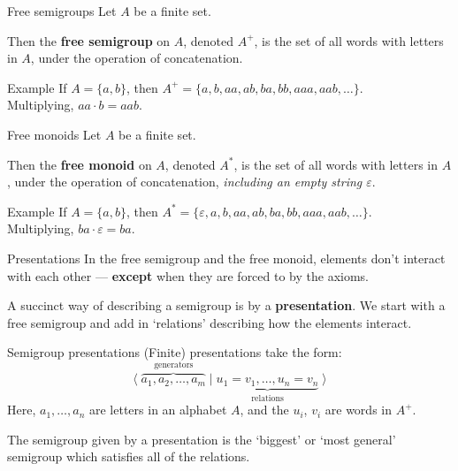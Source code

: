 \documentclass{beamer}
\let\epsilon\varepsilon
\newcommand{\pskip}{\medskip}
\begin{document}
\begin{frame}{Free semigroups}
	Let $A$ be a finite set.

	Then the \textbf{free semigroup} on $A$, denoted $A^+$, is the set of all words with letters in $A$, under the operation of concatenation. \phantom{, \emph{including an empty string $\epsilon$}}

	\pause
	\bigskip

	\begin{block}{Example}
		If $A = \{a, b\}$, then $A^+ = \{a, b, aa, ab, ba, bb, aaa, aab, \ldots\}$. \\
		Multiplying, $aa \cdot b = aab$.
	\end{block}
\end{frame}

\begin{frame}{Free monoids}
	Let $A$ be a finite set.

	Then the \textbf{free monoid} on $A$, denoted $A^*$, is the set of all words with letters in $A$, under the operation of concatenation, \emph{including an empty string $\epsilon$}.

	\bigskip

	\begin{block}{Example}
		If $A = \{a, b\}$, then $A^* = \{\epsilon, a, b, aa, ab, ba, bb, aaa, aab, \ldots\}$. \\
		Multiplying, $ba \cdot \epsilon = ba$.
	\end{block}
\end{frame}

\begin{frame}{Presentations}
	In the free semigroup and the free monoid, elements don't interact with each other --- \textbf{except} when they are forced to by the axioms.\pskip

	\pause
	A succinct way of describing a semigroup is by a \textbf{presentation}. We start with a free semigroup and add in `relations' describing how the elements interact.

\end{frame}

\begin{frame}{Semigroup presentations}
	(Finite) presentations take the form:
	\[
		\langle \; \overbrace{a_1, a_2, \ldots, a_m}^{\text{generators}}
			\mid 
			\underbrace{u_1 = v_1, \ldots, u_n = v_n}_{\text{relations}} \;
			\rangle
	\]
	Here, $a_1, \ldots, a_n$ are letters in an alphabet $A$, and the $u_i$, $v_i$ are words in $A^+$.\pskip

	The semigroup given by a presentation is the `biggest' or `most general' semigroup which satisfies all of the relations.
\end{frame}
\end{document}
